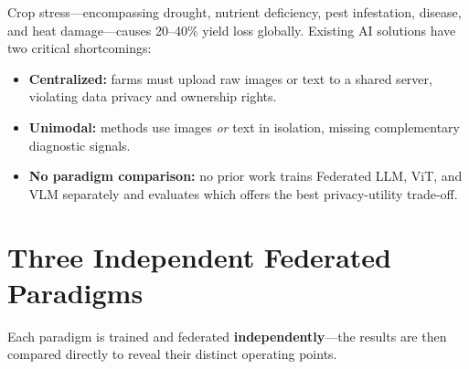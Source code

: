 \documentclass[11pt,a4paper]{article}
\begin{document}
Crop stress---encompassing drought, nutrient deficiency, pest infestation, disease, and heat
damage---causes 20--40\% yield loss globally.
Existing AI solutions have two critical shortcomings:

\begin{itemize}[leftmargin=1.5em, itemsep=2pt]
  \item \textbf{Centralized:} farms must upload raw images or text to a shared server,
        violating data privacy and ownership rights.
  \item \textbf{Unimodal:} methods use images \emph{or} text in isolation, missing
        complementary diagnostic signals.
  \item \textbf{No paradigm comparison:} no prior work trains Federated LLM, ViT, and VLM
        separately and evaluates which offers the best privacy-utility trade-off.
\end{itemize}

\section{Three Independent Federated Paradigms}

Each paradigm is trained and federated \textbf{independently}---the results are then compared
directly to reveal their distinct operating points.
\end{document}
